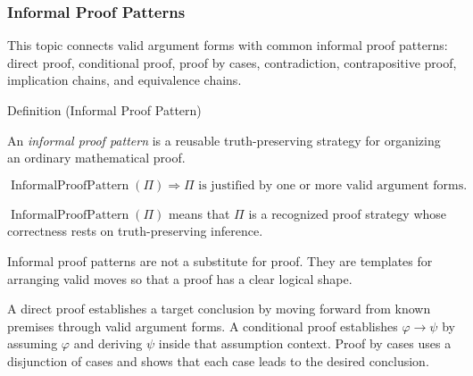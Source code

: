 \subsubsection*{Informal Proof Patterns}

\begin{remark*}
This topic connects valid argument forms with common informal proof patterns:
direct proof, conditional proof, proof by cases, contradiction, contrapositive
proof, implication chains, and equivalence chains.
\end{remark*}

\begin{definitionbox}{Definition (Informal Proof Pattern)}
\begin{definition}
\label{def:informal-proof-pattern-propositional-logic}
An \emph{informal proof pattern} is a reusable truth-preserving strategy for
organizing an ordinary mathematical proof.
\end{definition}
\end{definitionbox}

\begin{remark*}
\[
\operatorname{InformalProofPattern}(\Pi)
\Longrightarrow
\Pi\text{ is justified by one or more valid argument forms.}
\]
\end{remark*}

\begin{remark*}
\(\operatorname{InformalProofPattern}(\Pi)\) means that \(\Pi\) is a recognized
proof strategy whose correctness rests on truth-preserving inference.
\end{remark*}

\begin{remark*}[Interpretation]
Informal proof patterns are not a substitute for proof. They are templates for
arranging valid moves so that a proof has a clear logical shape.
\end{remark*}

\begin{remark*}[Exposition]
A direct proof establishes a target conclusion by moving forward from known
premises through valid argument forms. A conditional proof establishes
\(\varphi\to\psi\) by assuming \(\varphi\) and deriving \(\psi\) inside that
assumption context. Proof by cases uses a disjunction of cases and shows that
each case leads to the desired conclusion.
\end{remark*}

